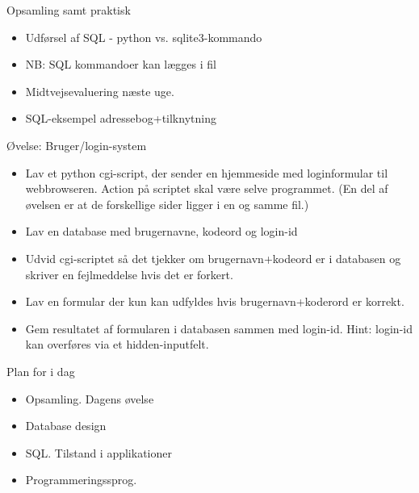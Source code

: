 \documentclass[a4paper,landscape]{slides}
\begin{document}
\begin{slide}
	\begin{center} {\large 
            Opsamling samt praktisk
	} \end{center}
	\begin{itemize} \addtolength{\itemsep}{-\baselineskip}
            \item Udførsel af SQL - python vs. sqlite3-kommando
            \item NB: SQL kommandoer kan lægges i fil
            \item Midtvejsevaluering næste uge.
            \item SQL-eksempel adressebog+tilknytning
	\end{itemize}
\end{slide}

\begin{slide}
	\begin{center} {\large 
            Øvelse: Bruger/login-system
	} \end{center}
	\begin{itemize} \addtolength{\itemsep}{-\baselineskip}
            \item Lav et python cgi-script, der sender en hjemmeside med loginformular til webbrowseren. Action på scriptet skal være selve programmet. (En del af øvelsen er at de forskellige sider ligger i en og samme fil.)
            \item Lav en database med brugernavne, kodeord og login-id
            \item Udvid cgi-scriptet så det tjekker om brugernavn+kodeord er i databasen og skriver en fejlmeddelse hvis det er forkert.
            \item Lav en formular der kun kan udfyldes hvis brugernavn+koderord er korrekt.
            \item Gem resultatet af formularen i databasen sammen med login-id. Hint: login-id kan overføres via et hidden-inputfelt.
	\end{itemize}
\end{slide}

\begin{slide}
	\begin{center} {\large 
            Plan for i dag
	} \end{center}
	\begin{itemize} \addtolength{\itemsep}{-\baselineskip}
		\item Opsamling. Dagens øvelse
                \item Database design
                \item SQL. Tilstand i applikationer
                \item Programmeringssprog. 
	\end{itemize}
\end{slide}
\end{document}
